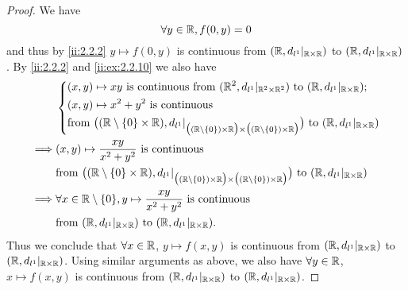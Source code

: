 \begin{proof}
  We have
  \[
    \forall y \in \mathbb{R}, f(0, y) = 0
  \]
  and thus by \cref{ii:2.2.2} \(y \mapsto f(0, y)\) is continuous from \((\mathbb{R}, d_{l^1}|_{\mathbb{R} \times \mathbb{R}})\) to \((\mathbb{R}, d_{l^1}|_{\mathbb{R} \times \mathbb{R}})\).
  By \cref{ii:2.2.2} and \cref{ii:ex:2.2.10} we also have
  \begin{align*}
             & \begin{dcases}
                 (x, y) \mapsto x y \text{ is continuous from } (\R^2, d_{l^1}|_{\R^2 \times \R^2}) \text{ to } (\R, d_{l^1}|_{\R \times \R}); \\
                 (x, y) \mapsto x^2 + y^2 \text{ is continuous}                                                                                \\
                 \text{from } \big((\R \setminus \set{0} \times \R), d_{l^1}|_{\big((\R \setminus \set{0}) \times \R\big) \times \big((\R \setminus \set{0}) \times \R\big)}\big) \text{ to } (\R, d_{l^1}|_{\R \times \R})
               \end{dcases}  \\
    \implies & (x, y) \mapsto \dfrac{xy}{x^2 + y^2} \text{ is continuous}                                                                                                                                                 \\
             & \text{from } \big((\R \setminus \set{0} \times \R), d_{l^1}|_{\big((\R \setminus \set{0}) \times \R\big) \times \big((\R \setminus \set{0}) \times \R\big)}\big) \text{ to } (\R, d_{l^1}|_{\R \times \R}) \\
    \implies & \forall x \in \R \setminus \set{0}, y \mapsto \dfrac{xy}{x^2 + y^2} \text{ is continuous}                                                                                                                  \\
             & \text{from } (\R, d_{l^1}|_{\R \times \R}) \text{ to } (\R, d_{l^1}|_{\R \times \R}).
  \end{align*}
  Thus we conclude that \(\forall x \in \mathbb{R}\), \(y \mapsto f(x, y)\) is continuous from \((\mathbb{R}, d_{l^1}|_{\mathbb{R} \times \mathbb{R}})\) to \((\mathbb{R}, d_{l^1}|_{\mathbb{R} \times \mathbb{R}})\).
  Using similar arguments as above, we also have \(\forall y \in \mathbb{R}\), \(x \mapsto f(x, y)\) is continuous from \((\mathbb{R}, d_{l^1}|_{\mathbb{R} \times \mathbb{R}})\) to \((\mathbb{R}, d_{l^1}|_{\mathbb{R} \times \mathbb{R}})\).


\end{proof}
